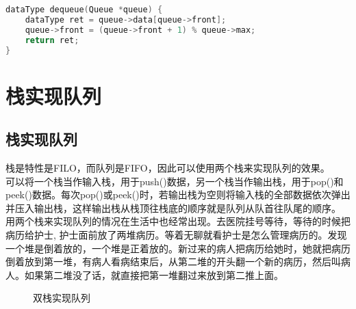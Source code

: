 \vspace{0.5cm}


\begin{lstlisting}[language=C]
dataType dequeue(Queue *queue) {
    dataType ret = queue->data[queue->front];
    queue->front = (queue->front + 1) % queue->max;
    return ret;
}
\end{lstlisting}

\newpage

\section{栈实现队列}

\subsection{栈实现队列}

栈是特性是FILO，而队列是FIFO，因此可以使用两个栈来实现队列的效果。 \\

可以将一个栈当作输入栈，用于push()数据，另一个栈当作输出栈，用于pop()和peek()数据。每次pop()或peek()时，若输出栈为空则将输入栈的全部数据依次弹出并压入输出栈，这样输出栈从栈顶往栈底的顺序就是队列从队首往队尾的顺序。 \\

用两个栈来实现队列的情况在生活中也经常出现。去医院挂号等待，等待的时候把病历给护士, 护士面前放了两堆病历。等着无聊就看护士是怎么管理病历的。发现一个堆是倒着放的，一个堆是正着放的。新过来的病人把病历给她时，她就把病历倒着放到第一堆，有病人看病结束后，从第二堆的开头翻一个新的病历，然后叫病人。如果第二堆没了话，就直接把第一堆翻过来放到第二推上面。

\begin{figure}[H]
	\centering
	\caption{双栈实现队列}
\end{figure}


